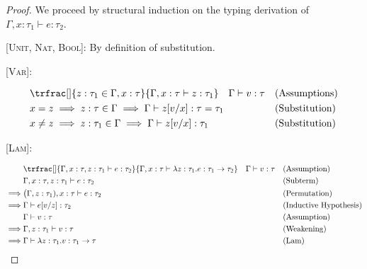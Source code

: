 \documentclass[nonacm]{acmart}
\begin{document}
\begin{proof}
  We proceed by structural induction on the typing derivation of \(\Gamma, x : \tau_1 \vdash e : \tau_2\).

  [\textsc{Unit, Nat, Bool}]: By definition of substitution.

  [\textsc{Var}]:

  \vspace*{-1em}
  \begin{align*}
    & \trfrac[]{z : \tau_1 \in \Gamma, x : \tau}{\Gamma, x : \tau \vdash z : \tau_1} \quad \Gamma \vdash v : \tau && \text{(Assumptions)} \\
    & x = z \implies z : \tau \in \Gamma \implies \Gamma \vdash z[v/x] : \tau = \tau_1 && \text{(Substitution)} \\
    & x \neq z \implies z : \tau_1 \in \Gamma \implies \Gamma \vdash z[v/x] : \tau_1 && \text{(Substitution)}
  \end{align*}

  [\textsc{Lam}]:

  \vspace*{-1em}
  \begin{align*}
    & \trfrac[]{\Gamma, x : \tau, z : \tau_1 \vdash e : \tau_2}{\Gamma, x : \tau \vdash \lambda z : \tau_1 . e : \tau_{1} \rightarrow \tau_2}
        \quad \Gamma \vdash v : \tau  && \text{(Assumption)} \\
    & \Gamma, x : \tau, z : \tau_1 \vdash e : \tau_2 && \text{(Subterm)} \\
    \implies & \big(\Gamma, z : \tau_1), x : \tau \vdash e : \tau_2 && \text{(Permutation)} \\
    \implies & \Gamma \vdash e[v/z] : \tau_2 && \text{(Inductive Hypothesis)} \\
    & \Gamma \vdash v : \tau && \text{(Assumption)} \\
    \implies & \Gamma, z : \tau_1 \vdash v : \tau && \text{(Weakening)} \\
    \implies & \Gamma \vdash \lambda z : \tau_1 . v : \tau_{1} \rightarrow \tau && \text{(Lam)}
  \end{align*}


\end{proof}
\end{document}
